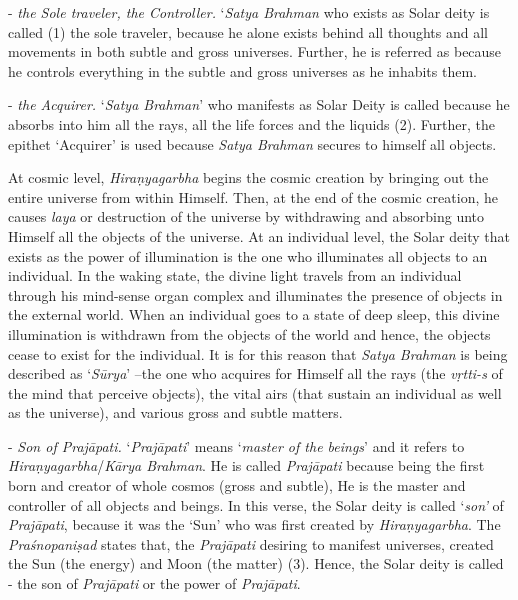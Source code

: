  - \emph{the Sole traveler, the Controller.} `\emph{Satya Brahman} who exists as Solar deity is called  (1) the sole traveler, because he alone exists behind all thoughts and all movements in both subtle and gross universes. Further, he is referred as  because he controls everything in the subtle and gross universes as he inhabits them.

- \emph{the Acquirer.} `\emph{Satya Brahman}' who manifests as Solar Deity is called  because he absorbs into him all the rays, all the life forces and the liquids (2). Further, the epithet `Acquirer' is used because \emph{Satya Brahman} secures to himself all objects.

At cosmic level, \emph{Hiraṇyagarbha} begins the cosmic creation by bringing out the entire universe from within Himself. Then, at the end of the cosmic creation, he causes \emph{laya} or destruction of the universe by withdrawing and absorbing unto Himself all the objects of the universe. At an individual level, the Solar deity that exists as the power of illumination is the one who illuminates all objects to an individual. In the waking state, the divine light travels from an individual through his mind-sense organ complex and illuminates the presence of objects in the external world. When an individual goes to a state of deep sleep, this divine illumination is withdrawn from the objects of the world and hence, the objects cease to exist for the individual. It is for this reason that \emph{Satya Brahman} is being described as `\emph{Sūrya}' --the one who acquires for Himself all the rays (the \emph{vṛtti-s} of the mind that perceive objects), the vital airs (that sustain an individual as well as the universe), and various gross and subtle matters.

- \emph{Son of Prajāpati.} `\emph{Prajāpati}' means `\emph{master of the beings}' and it refers to \emph{Hiraṇyagarbha}/\emph{Kārya Brahman}. He is called \emph{Prajāpati} because being the first born and creator of whole cosmos (gross and subtle), He is the master and controller of all objects and beings. In this verse, the Solar deity is called `\emph{son'} of \emph{Prajāpati}, because it was the `Sun' who was first created by \emph{Hiraṇyagarbha}. The \emph{Praśnopaniṣad} states that, the \emph{Prajāpati} desiring to manifest universes, created the Sun (the energy) and Moon (the matter) (3). Hence, the Solar deity is called - the son of \emph{Prajāpati} or the power of \emph{Prajāpati}.

